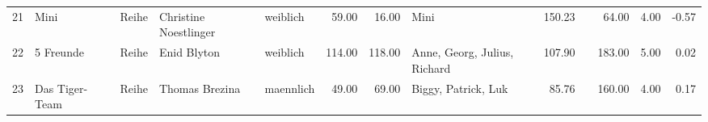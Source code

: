 \begin{sidewaystable}[ht]
\begin{center}
{\begin{tabular}{rllllrrlrrrrr}
  21 & Mini                                                                                                                                                                                                                                                            & Reihe & Christine Noestlinger                                                                                                                                                                                                                                           & weiblich & 59.00 & 16.00 & Mini                                                                                                                                                                                                                                                            & 150.23 &  & 64.00 & 4.00 & -0.57 \\ 
  22 & 5 Freunde                                                                                                                                                                                                                                                       & Reihe & Enid Blyton                                                                                                                                                                                                                                                     & weiblich & 114.00 & 118.00 & Anne, Georg, Julius, Richard                                                                                                                                                                                                                                    & 107.90 &  & 183.00 & 5.00 & 0.02 \\ 
  23 & Das Tiger- Team                                                                                                                                                                                                                                                 & Reihe & Thomas Brezina                                                                                                                                                                                                                                                  & maennlich & 49.00 & 69.00 & Biggy, Patrick, Luk                                                                                                                                                                                                                                             & 85.76 &  & 160.00 & 4.00 & 0.17 \\ 

\end{tabular}}
\end{center}
\end{sidewaystable}
